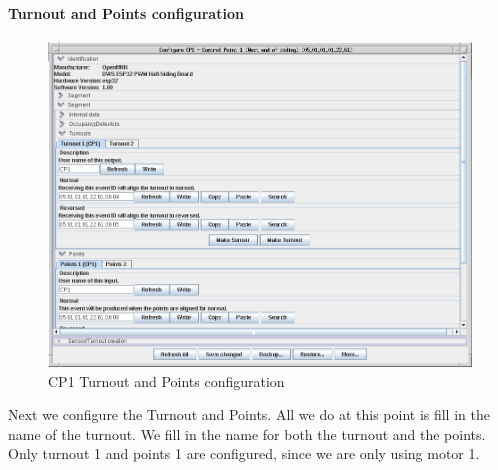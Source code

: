 \clearpage
\paragraph{Turnout and Points configuration}
\begin{figure}[hbpt]\begin{centering}%
\includegraphics[width=5in]{CP1-Turnout-Config.png}
\caption{CP1 Turnout and Points configuration}
\label{fig:CP1-Turnout-Config}
\end{centering}\end{figure}
Next we configure the Turnout and Points.  All we do at this point is fill in 
the name of the turnout.  We fill in the name for both the turnout and the 
points.  Only turnout 1 and points 1 are configured, since we are only using 
motor 1.

\clearpage
